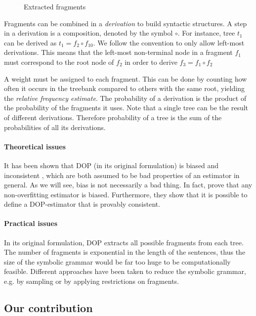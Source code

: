 \begin{figure}[h!]
\center 
\caption{Extracted fragments}
\label{f:fragments}
\end{figure}


Fragments can be combined in a \emph{derivation} to build syntactic structures. A step in a derivation is a composition, denoted by the symbol $\circ$. For instance, tree $t_1$ can be derived as $t_1=f_2\circ f_{10}$. We follow the convention to only allow left-most derivations. This means that the left-most non-terminal node in a fragment $f_1$ must correspond to the root node of $f_2$ in order to derive $f_3=f_1\circ f_2$

A weight must be assigned to each fragment. This can be done by counting how often it occurs in the treebank compared to others with the same root, yielding the \emph{relative frequency estimate}. The probability of a derivation is the product of the probability of the fragments it uses. Note that a single tree can be the result of different derivations. Therefore probability of a tree is the sum of the probabilities of all its derivations.

\paragraph{Theoretical issues}
It has been shown that DOP (in its original formulation) is biased and inconsistent \cite{johnson2002}, which are both assumed to be bad properties of an estimator in general. As we will see, bias is not necessarily a bad thing. In fact, \cite{zollmann2005} prove that any non-overfitting estimator is biased. Furthermore, they show that it is possible to define a DOP-estimator that is provably consistent. %


\paragraph{Practical issues}
In its original formulation, DOP extracts all possible fragments from each tree. The number of fragments is exponential in the length of the sentences, thus the size of the symbolic grammar would be far too huge to be computationally feasible. %
Different approaches have been taken to reduce the symbolic grammar, e.g. by sampling or by applying restrictions on fragments.

\subsection{Our contribution}

